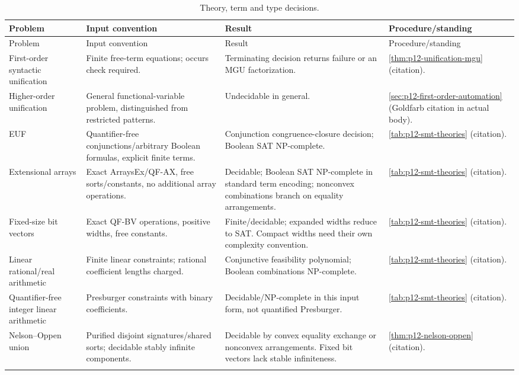 \begin{landscape}
\begingroup\small\setlength{\tabcolsep}{3pt}
\begin{longtable}{@{}p{.18\linewidth}p{.25\linewidth}p{.23\linewidth}p{.26\linewidth}@{}}
\caption{Theory, term and type decisions.}\label{tab:p14-dc-smt-types}\\
\toprule
Problem & Input convention & Result & Procedure/standing\\\midrule
\endfirsthead
\toprule
Problem & Input convention & Result & Procedure/standing\\\midrule
\endhead
\bottomrule\endfoot
First-order syntactic unification & Finite free-term equations; occurs check required. & Terminating decision returns failure or an MGU factorization. & \cref{thm:p12-unification-mgu} (citation).\\\addlinespace
Higher-order unification & General functional-variable problem, distinguished from restricted patterns. & Undecidable in general. & \cref{sec:p12-first-order-automation} (Goldfarb citation in actual body).\\\addlinespace
EUF & Quantifier-free conjunctions/arbitrary Boolean formulas, explicit finite terms. & Conjunction congruence-closure decision; Boolean SAT NP-complete. & \cref{tab:p12-smt-theories} (citation).\\\addlinespace
Extensional arrays & Exact ArraysEx/QF-AX, free sorts/constants, no additional array operations. & Decidable; Boolean SAT NP-complete in standard term encoding; nonconvex combinations branch on equality arrangements. & \cref{tab:p12-smt-theories} (citation).\\\addlinespace
Fixed-size bit vectors & Exact QF-BV operations, positive widths, free constants. & Finite/decidable; expanded widths reduce to SAT. Compact widths need their own complexity convention. & \cref{tab:p12-smt-theories} (citation).\\\addlinespace
Linear rational/real arithmetic & Finite linear constraints; rational coefficient lengths charged. & Conjunctive feasibility polynomial; Boolean combinations NP-complete. & \cref{tab:p12-smt-theories} (citation).\\\addlinespace
Quantifier-free integer linear arithmetic & Presburger constraints with binary coefficients. & Decidable/NP-complete in this input form, not quantified Presburger. & \cref{tab:p12-smt-theories} (citation).\\\addlinespace
Nelson--Oppen union & Purified disjoint signatures/shared sorts; decidable stably infinite components. & Decidable by convex equality exchange or nonconvex arrangements. Fixed bit vectors lack stable infiniteness. & \cref{thm:p12-nelson-oppen} (citation).\\\addlinespace

\end{longtable}
\end{landscape}

